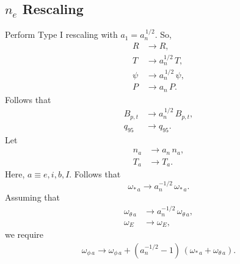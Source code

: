 \documentclass[12pt]{article}
\begin{document}
\subsection{$n_e$ Rescaling}
Perform Type I rescaling with $a_1 =a_n^{\,1/2}$. So,
\begin{align}
R&\rightarrow R,\\[0.5ex]
T&\rightarrow a_n^{1/2}\,T,\\[0.5ex]
\psi&\rightarrow a_n^{\,1/2}\,\psi,\\[0.5ex]
P&\rightarrow a_n\,P.
\end{align}
Follows that
\begin{align}
B_{p,t}&\rightarrow a_n^{\,1/2}\,B_{p,t},\\[0.5ex]
q_{95}&\rightarrow q_{95}.
\end{align}
Let
\begin{align}
n_a&\rightarrow a_n\,n_a,\\[0.5ex]
T_a&\rightarrow T_a.
\end{align}
Here, $a\equiv e, i, b, I$. 
Follows that
\begin{equation}
\omega_{\ast\,a} \rightarrow a_n^{-1/2}\,\omega_{\ast\,a}.
\end{equation}
Assuming that
\begin{align}
\omega_{\theta\,a}&\rightarrow a_n^{-1/2}\,\omega_{\theta\,a},\\[0.5ex]
\omega_E&\rightarrow\omega_E,
\end{align}
we require 
\begin{align}
\omega_{\phi\,a}\rightarrow \omega_{\phi\,a}+(a_n^{-1/2}-1)\,(\omega_{\ast\,a}+\omega_{\theta\,a}).
\end{align}
\end{document}
